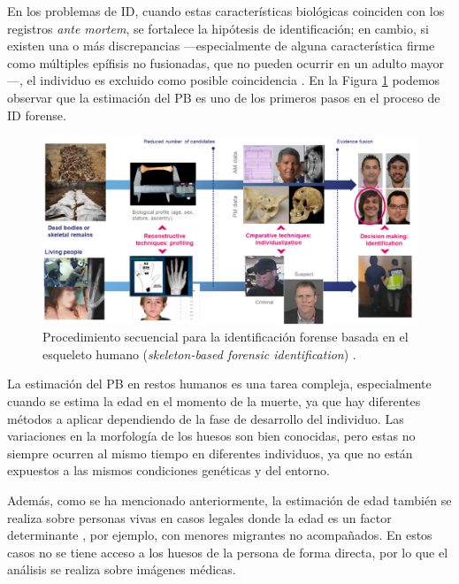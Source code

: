 En los problemas de \acrshort{ID}, cuando estas características biológicas coinciden con los registros \textit{ante mortem}, se fortalece la hipótesis de identificación; en cambio, si existen una o más discrepancias ---especialmente de alguna característica firme como múltiples epífisis no fusionadas, que no pueden ocurrir en un adulto mayor---, el individuo es excluido como posible coincidencia \cite{byers2023}. En la Figura \ref{fig:SFI_pipeline} podemos observar que la estimación del \acrshort{PB} es uno de los primeros pasos en el proceso de \acrshort{ID} forense. 

\begin{figure}[htbp]
    \centering
    \includegraphics[width=\textwidth]{capitulos/cap_01/imagenes/SFI_pipeline.png}
    \caption[
        Procedimiento secuencial para la identificación forense basada en el esqueleto humano (\textit{skeleton-based forensic identification}).
    ]{
        Procedimiento secuencial para la identificación forense basada en el esqueleto humano (\textit{skeleton-based forensic identification}) \cite{mesejo2020}.
    } 
    \label{fig:SFI_pipeline}
\end{figure}

La estimación del \acrshort{PB} en restos humanos es una tarea compleja, especialmente cuando se estima la edad en el momento de la muerte, ya que hay diferentes métodos a aplicar dependiendo de la fase de desarrollo del individuo. Las variaciones en la morfología de los huesos son bien conocidas, pero estas no siempre ocurren al mismo tiempo en diferentes individuos, ya que no están expuestos a las mismos condiciones genéticas y del entorno.

Además, como se ha mencionado anteriormente, la estimación de edad también se realiza sobre personas vivas en casos legales donde la edad es un factor determinante \cite{schmeling2016}, por ejemplo, con menores migrantes no acompañados. En estos casos no se tiene acceso a los huesos de la persona de forma directa, por lo que el análisis se realiza sobre imágenes médicas.

